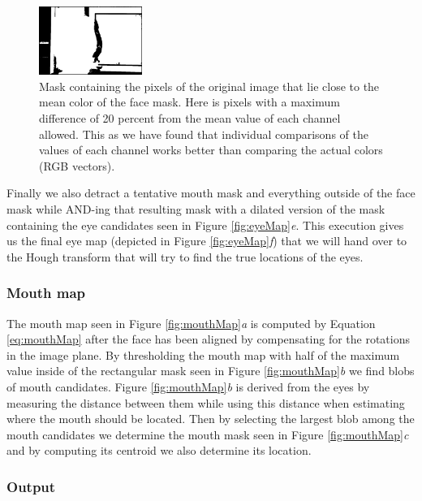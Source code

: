 \begin{figure}[H]
\centering
\includegraphics[width=0.3\textwidth]{img/fd2/averageFaceColorMask.png}
\caption{Mask containing the pixels of the original image that lie close to the mean color of the face mask. Here is pixels with a maximum difference of 20 percent from the mean value of each channel allowed. This as we have found that individual comparisons of the values of each channel works better than comparing the actual colors (RGB vectors).}
\label{fig:averageFaceColorMask}
\end{figure}

Finally we also detract a tentative mouth mask and everything outside of the face mask while AND-ing that resulting mask with a dilated version of the mask containing the eye candidates seen in Figure \ref{fig:eyeMap}\textit{e}. This execution gives us the final eye map (depicted in Figure \ref{fig:eyeMap}\textit{f}) that we will hand over to the Hough transform that will try to find the true locations of the eyes.


\subsubsection{Mouth map}

The mouth map seen in Figure \ref{fig:mouthMap}\textit{a} is computed by 
Equation \ref{eq:mouthMap} after the face has been aligned by compensating for the rotations in the image plane. By thresholding the mouth map with half of the maximum value inside of the rectangular mask seen in Figure \ref{fig:mouthMap}\textit{b} we find blobs of mouth candidates. Figure \ref{fig:mouthMap}\textit{b} is derived from the eyes by measuring the distance between them while using this distance when estimating where the mouth should be located. Then by selecting the largest blob among the mouth candidates we determine the mouth mask seen in Figure \ref{fig:mouthMap}\textit{c} and by computing its centroid we also determine its location. 







\subsubsection{Output}

